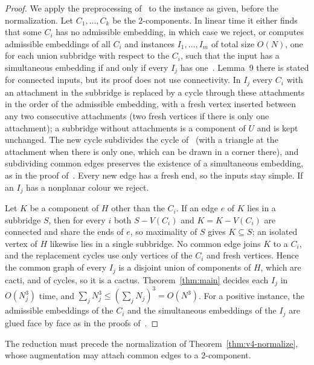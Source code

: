 \begin{proof}
We apply the preprocessing of~\cite[Section~4]{BKR18} to the instance as
given, before the normalization. Let $C_1,\dots,C_k$ be the
$2$-components. In linear time it either finds that some $C_i$ has no
admissible embedding, in which case we reject, or computes admissible
embeddings of all $C_i$ and instances $I_1,\dots,I_m$ of total size $O(N)$,
one for each union subbridge with respect to the $C_i$, such that the input
has a simultaneous embedding if and only if every $I_j$ has
one~\cite[Lemmas~7 and~9]{BKR18}. Lemma~9 there is stated for connected
inputs, but its proof does not use connectivity. In $I_j$ every $C_i$ with
an attachment in the subbridge is replaced by a cycle through these
attachments in the order of the admissible embedding, with a fresh vertex
inserted between any two consecutive attachments (two fresh vertices if
there is only one attachment); a subbridge without attachments is a
component of $U$ and is kept unchanged. The new cycle subdivides the cycle
of~\cite{BKR18} (with a triangle at the attachment when there is only one,
which can be drawn in a corner there), and subdividing common edges
preserves the existence of a simultaneous embedding, as in the proof
of~\cite[Lemma~9]{BKR18}. Every new edge has a fresh end, so the
inputs stay simple. If an $I_j$ has a nonplanar colour we reject.

Let $K$ be a component of $H$ other than the $C_i$. If an edge $e$ of $K$
lies in a subbridge $S$, then for every $i$ both $S-V(C_i)$ and $K=K-V(C_i)$
are connected and share the ends of $e$, so maximality of $S$ gives
$K\subseteq S$; an isolated vertex of $H$ likewise lies in a single
subbridge. No common edge joins $K$ to a $C_i$, and the replacement cycles
use only vertices of the $C_i$ and fresh vertices. Hence the common graph of
every $I_j$ is a disjoint union of components of $H$, which are cacti, and
of cycles, so it is a cactus. Theorem~\ref{thm:main} decides each $I_j$ in
$O(N_j^3)$ time, and $\sum_jN_j^3\le(\sum_jN_j)^3=O(N^3)$. For a positive
instance, the admissible embeddings of the $C_i$ and the simultaneous
embeddings of the $I_j$ are glued face by face as in the proofs
of~\cite[Lemmas~7 and~9]{BKR18}.
\end{proof}

The reduction must precede the normalization of
Theorem~\ref{thm:v4-normalize}, whose augmentation may attach common edges
to a $2$-component.

